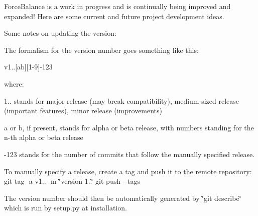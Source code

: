 \-Force\-Balance is a work in progress and is continually being improved and expanded! \-Here are some current and future project development ideas.

\-Some notes on updating the version\-:

\-The formalism for the version number goes something like this\-:

v1..\mbox{[}ab\mbox{]}\mbox{[}1-\/9\mbox{]}-\/123

where\-: \begin{DoxyItemize}
\item 1.. stands for major release (may break compatibility), medium-\/sized release (important features), minor release (improvements) \item a or b, if present, stands for alpha or beta release, with numbers standing for the n-\/th alpha or beta release \item -\/123 stands for the number of commits that follow the manually specified release.\end{DoxyItemize}
\-To manually specify a release, create a tag and push it to the remote repository\-: git tag -\/a v1.. -\/m \char`\"{}version 1..\char`\"{} git push -\/-\/tags

\-The version number should then be automatically generated by \char`\"{}git describe\char`\"{} which is run by setup.\-py at installation.

